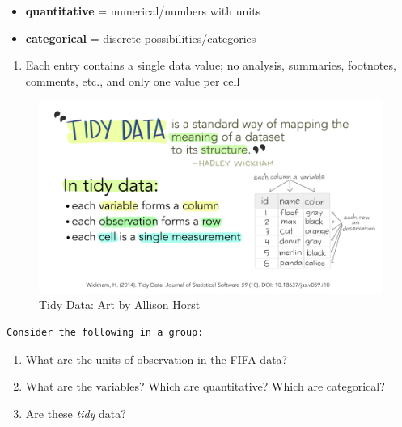 \documentclass[
  letterpaper,
  DIV=11,
  numbers=noendperiod]{scrreprt}
\providecommand{\tightlist}{%
  \setlength{\itemsep}{0pt}\setlength{\parskip}{0pt}}\usepackage{longtable,booktabs,array}
\begin{document}
\begin{itemize}
\tightlist
\item
  \textbf{quantitative} = numerical/numbers with units\\
\item
  \textbf{categorical} = discrete possibilities/categories\\
\end{itemize}

\begin{enumerate}
\def\labelenumi{\arabic{enumi}.}
\setcounter{enumi}{2}
\tightlist
\item
  Each entry contains a single data value; no analysis, summaries,
  footnotes, comments, etc., and only one value per cell
\end{enumerate}

\begin{figure}[H]

{\centering \includegraphics{src/../images/tidydata_1.jpg}

}

\caption{Tidy Data: Art by Allison Horst}

\end{figure}%

\begin{verbatim}
Consider the following in a group:   
\end{verbatim}

\begin{enumerate}
\def\labelenumi{\alph{enumi}.}
\tightlist
\item
  What are the units of observation in the FIFA data?\\
\item
  What are the variables? Which are quantitative? Which are
  categorical?\\
\item
  Are these \emph{tidy} data?
\end{enumerate}
\end{document}
